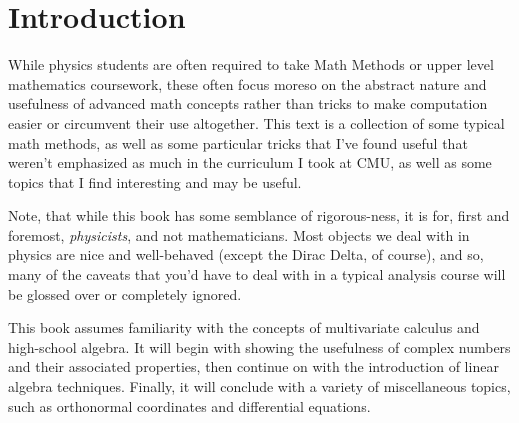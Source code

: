 \chapter*{Introduction}
While physics students are often required to take Math Methods or upper level mathematics coursework, these often focus moreso on the abstract nature and usefulness of advanced math concepts rather than tricks to make computation easier or circumvent their use altogether. This text is a collection of some typical math methods, as well as some particular tricks that I've found useful that weren't emphasized as much in the curriculum I took at CMU, as well as some topics that I find interesting and may be useful. 

Note, that while this book has some semblance of rigorous-ness, it is for, first and foremost, \emph{physicists}, and not mathematicians. Most objects we deal with in physics are nice and well-behaved (except the Dirac Delta, of course), and so, many of the caveats that you'd have to deal with in a typical analysis course will be glossed over or completely ignored. 

This book assumes familiarity with the concepts of multivariate calculus and high-school algebra. It will begin with showing the usefulness of complex numbers and their associated properties, then continue on with the introduction of linear algebra techniques. Finally, it will conclude with a variety of miscellaneous topics, such as orthonormal coordinates and differential equations.
